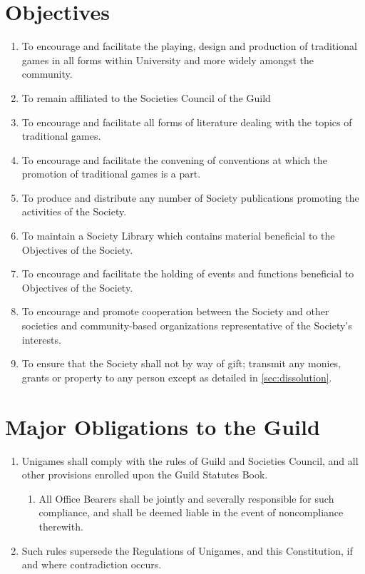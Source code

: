 \documentclass[a4paper]{article}
\begin{document}
\section{Objectives} \label{sec:objectives}
\begin{enumerate}
    \item To encourage and facilitate the playing, design and production of traditional games in all forms within University and more widely amongst the community.
    \item To remain affiliated to the Societies Council of the Guild
    \item To encourage and facilitate all forms of literature dealing with the topics of traditional games.
    \item To encourage and facilitate the convening of conventions at which the promotion of traditional games is a part.
    \item To produce and distribute any number of Society publications promoting the activities of the Society.
    \item To maintain a Society Library which contains material beneficial to the Objectives of the Society.
    \item To encourage and facilitate the holding of events and functions beneficial to Objectives of the Society.
    \item To encourage and promote cooperation between the Society and other societies and community-based organizations representative of the Society's interests.
    \item To ensure that the Society shall not by way of gift; transmit any monies, grants or property to any person except as detailed in \cref{sec:dissolution}.
\end{enumerate}

\section{Major Obligations to the Guild} \label{sec:guild}
\begin{enumerate}
    \item Unigames shall comply with the rules of Guild and Societies Council, and all other provisions enrolled upon the Guild Statutes Book.
        \begin{enumerate}
            \item All Office Bearers shall be jointly and severally responsible for such compliance, and shall be deemed liable in the event of noncompliance therewith.
        \end{enumerate}
    \item Such rules supersede the Regulations of Unigames, and this Constitution, if and where contradiction occurs.
\end{enumerate}
\end{document}
